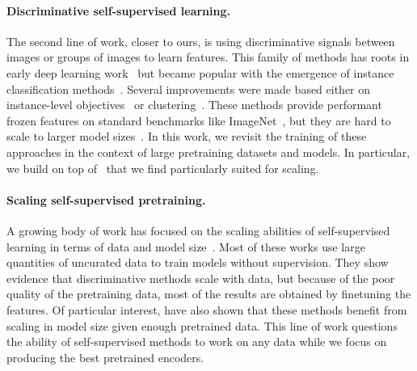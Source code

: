 \paragraph{Discriminative self-supervised learning.} The second line of work, closer to ours, is using discriminative signals between images or groups of images to learn features. This family of methods has roots in early deep learning work~\citep{hadsell2006dimensionality} but became popular with the emergence of instance classification methods~\citep{dosovitskiy2016discriminative, bojanowski2017unsupervised, wu2018unsupervised}. Several improvements were made based either on instance-level objectives~\citep{henaff2019data,he2020momentum, chen2020exploring, chen2020simple,grill2020bootstrap, caron2021emerging} or clustering~\citep{caron2018deep,asano2019self, caron2020unsupervised}. These methods provide performant frozen features on standard benchmarks like ImageNet~\citep{russakovsky2015imagenet}, but they are hard to scale to larger model sizes~\citep{chen2021empirical}. In this work, we revisit the training of these approaches in the context of large pretraining datasets and models. In particular, we build on top of~\cite{zhou2021ibot} that we find particularly suited for scaling.

\paragraph{Scaling self-supervised pretraining.} A growing body of work has focused on the scaling abilities of self-supervised learning in terms of data and model size~\citep{caron2019unsupervised, goyal2019scaling, tian2021divide, goyal2022vision}. Most of these works use large quantities of uncurated data to train models without supervision. They show evidence that discriminative methods scale with data, but because of the poor quality of the pretraining data, most of the results are obtained by finetuning the features. Of particular interest, \cite{goyal2021self} have also shown that these methods benefit from scaling in model size given enough pretrained data. This line of work questions the ability of self-supervised methods to work on any data while we focus on producing the best pretrained encoders.

